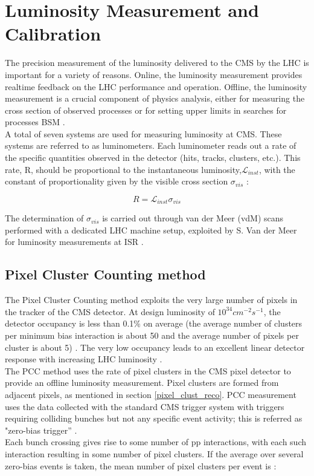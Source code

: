 \chapter{Luminosity  Measurement and Calibration}
\label{ch3}

The precision measurement of the luminosity delivered to the CMS by the LHC is important for a variety of reasons. Online, the luminosity measurement provides realtime feedback on the LHC performance and operation. Offline, the luminosity measurement is a crucial component of physics analysis, either for measuring the cross section of observed processes or for setting upper limits in searches for processes BSM \cite{pas_18}.\\
A total of seven systems are used for measuring luminosity at CMS. These systems are referred to as luminometers.  Each luminometer reads out a rate of the specific quantities observed in the detector (hits, tracks, clusters, etc.). This rate, R, should be proportional to the instantaneous luminosity,$\mathcal{L}_{inst}$, with the constant of proportionality given by the visible cross section $\sigma_{vis}$ \cite{pas_18}:

\begin{equation}
R=\mathcal{L}_{inst}\sigma_{vis}
\label{lumi_exp_gen}
\end{equation}

The determination of $\sigma_{vis}$ is carried out through van der Meer (vdM) scans performed with a dedicated LHC machine setup, exploited by S. Van der Meer for luminosity measurements at ISR \cite{vdM_cal}.

\section{Pixel Cluster Counting method}
The Pixel Cluster Counting method exploits the very large number of pixels in the tracker of the CMS detector. At design luminosity of $10^{34}cm^{-2}s^{-1}$, the detector occupancy is less than 0.1\% on average (the average number of clusters per minimum bias interaction is about 50 and the average number of pixels per cluster is about 5) \cite{pas-13}. The very low occupancy leads to an excellent linear detector response with increasing LHC luminosity \cite{pas_18}. \\
The PCC method uses the rate of pixel clusters in the CMS pixel detector to provide an offline luminosity measurement. Pixel clusters are formed from adjacent pixels, as mentioned in section \ref{pixel_clust_reco}. PCC measurement uses the data collected with the standard CMS trigger system with triggers requiring colliding bunches but not any specific event activity; this is referred as "zero-bias trigger'' \cite{pas_18}.\\
Each bunch crossing gives rise to some number of pp interactions, with each such interaction resulting in some number of pixel clusters. If the average over several zero-bias events is taken, the mean number of pixel clusters per event is \cite{PCC_PAS_12_001}:

